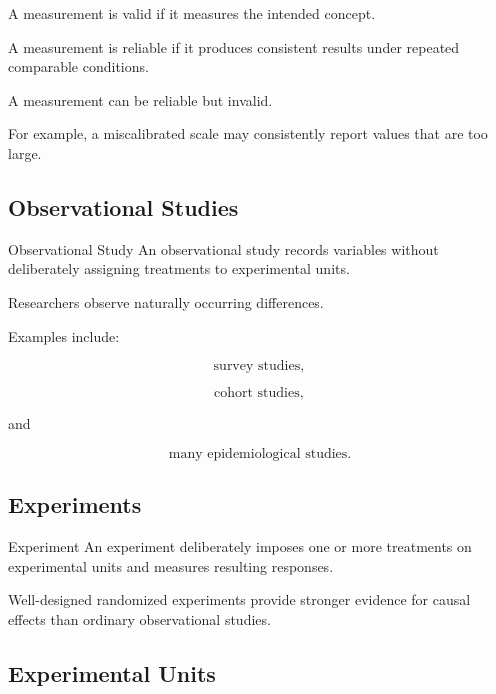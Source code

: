 A measurement is valid if it measures the intended concept.

A measurement is reliable if it produces consistent results under
repeated comparable conditions.

A measurement can be reliable but invalid.

For example, a miscalibrated scale may consistently report values that
are too large.

\subsection{Observational Studies}
\label{subsec:observational-studies}

\begin{definitionbox}{Observational Study}
An observational study records variables without deliberately assigning
treatments to experimental units.
\end{definitionbox}

Researchers observe naturally occurring differences.

Examples include:

\[
\text{survey studies},
\]

\[
\text{cohort studies},
\]

and

\[
\text{many epidemiological studies}.
\]

\subsection{Experiments}
\label{subsec:experiments}

\begin{definitionbox}{Experiment}
An experiment deliberately imposes one or more treatments on
experimental units and measures resulting responses.
\end{definitionbox}

Well-designed randomized experiments provide stronger evidence for
causal effects than ordinary observational studies.

\subsection{Experimental Units}
\label{subsec:experimental-units}

